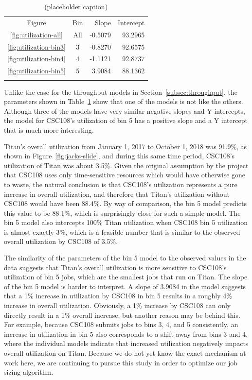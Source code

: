 \begin{table}
\caption{(placeholder caption)}
\label{tab:utilization-params}       %
\begin{tabular}{ccrr}
\hline\noalign{\smallskip}
Figure  &   Bin & Slope   & Intercept   \\
\noalign{\smallskip}\hline\noalign{\smallskip}
\ref{fig:utilization-all}    &   All &  -0.5079 &   93.2965 \\
\ref{fig:utilization-bin3}   &   3   &  -0.8270 &   92.6575 \\
\ref{fig:utilization-bin4}   &   4   &  -1.1121 &   92.8737 \\
\ref{fig:utilization-bin5}   &   5   &  3.9084  &   88.1362 \\
\noalign{\smallskip}\hline
\end{tabular}
\end{table}

Unlike the case for the throughput models in Section~\ref{subsec:throughput},
the parameters shown in Table~\ref{tab:utilization-params} show that one of the
models is not like the others. Although three of the models have very similar
negative slopes and Y intercepts, the model for CSC108's utilization of bin 5
has a positive slope and a Y intercept that is much more interesting.

Titan's overall utilization from January 1, 2017 to October 1, 2018 was
91.9\%, as shown in Figure~\ref{fig:jacks-slide}, and during this same time
period, CSC108's utilization of Titan was about 3.5\%. Given the original
assumption by the project that CSC108 uses only time-sensitive resources which
would have otherwise gone to waste, the natural conclusion is that CSC108's
utilization represents a pure increase in overall utilization, and therefore
that Titan's utilization without CSC108 would have been 88.4\%. By way of
comparison, the bin 5 model predicts this value to be 88.1\%, which is
surprisingly close for such a simple model. The bin 5 model also intercepts
100\% Titan utilization when CSC108 bin 5 utilization is almost exactly 3\%,
which is a feasible number that is similar to the observed overall utilization
by CSC108 of 3.5\%.

The similarity of the parameters of the bin 5 model to the observed values in
the data suggests that Titan's overall utilization is more sensitive to
CSC108's utilization of bin 5 jobs, which are the smallest jobs that run on
Titan. The slope of the bin 5 model is harder to interpret. A slope of 3.9084
in the model suggests that a 1\% increase in utilization by CSC108 in bin 5
results in a roughly 4\% increase in overall utilization. Obviously, a 1\%
increase by CSC108 can only directly result in a 1\% overall increase, but
another reason may be behind this. For example, because CSC108 submits jobs to
bins 3, 4, and 5 consistently, an increase in utilization in bin 5 also
corresponds to a shift away from bins 3 and 4, where the individual models
indicate that increased utilization negatively impacts overall utilization on
Titan. Because we do not yet know the exact mechanism at work here, we are
continuing to pursue this study in order to optimize our job sizing algorithm.


